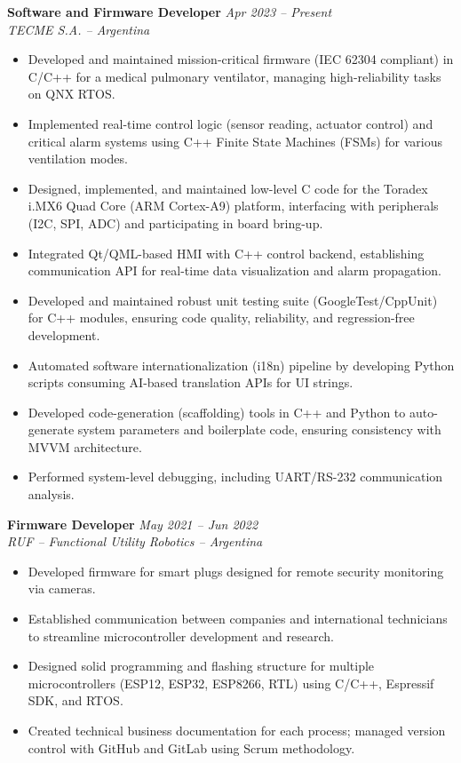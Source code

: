 \documentclass[11pt,a4paper]{article}
\newcommand{\resumeItem}[1]{\item #1}
\newcommand{\jobentry}[3]{%
    \noindent\textbf{#1} \hfill \textit{#2}\\
    \textit{#3}
}
\begin{document}
\jobentry{Software and Firmware Developer}{Apr 2023 -- Present}{TECME S.A. -- Argentina}
\begin{itemize}[leftmargin=*, nosep, topsep=4pt]
    \resumeItem{Developed and maintained mission-critical firmware (IEC 62304 compliant) in C/C++ for a medical pulmonary ventilator, managing high-reliability tasks on QNX RTOS.}
    \resumeItem{Implemented real-time control logic (sensor reading, actuator control) and critical alarm systems using C++ Finite State Machines (FSMs) for various ventilation modes.}
    \resumeItem{Designed, implemented, and maintained low-level C code for the Toradex i.MX6 Quad Core (ARM Cortex-A9) platform, interfacing with peripherals (I2C, SPI, ADC) and participating in board bring-up.}
    \resumeItem{Integrated Qt/QML-based HMI with C++ control backend, establishing communication API for real-time data visualization and alarm propagation.}
    \resumeItem{Developed and maintained robust unit testing suite (GoogleTest/CppUnit) for C++ modules, ensuring code quality, reliability, and regression-free development.}
    \resumeItem{Automated software internationalization (i18n) pipeline by developing Python scripts consuming AI-based translation APIs for UI strings.}
    \resumeItem{Developed code-generation (scaffolding) tools in C++ and Python to auto-generate system parameters and boilerplate code, ensuring consistency with MVVM architecture.}
    \resumeItem{Performed system-level debugging, including UART/RS-232 communication analysis.}
\end{itemize}

\vspace{6pt}

\jobentry{Firmware Developer}{May 2021 -- Jun 2022}{RUF -- Functional Utility Robotics -- Argentina}
\begin{itemize}[leftmargin=*, nosep, topsep=4pt]
    \resumeItem{Developed firmware for smart plugs designed for remote security monitoring via cameras.}
    \resumeItem{Established communication between companies and international technicians to streamline microcontroller development and research.}
    \resumeItem{Designed solid programming and flashing structure for multiple microcontrollers (ESP12, ESP32, ESP8266, RTL) using C/C++, Espressif SDK, and RTOS.}
    \resumeItem{Created technical business documentation for each process; managed version control with GitHub and GitLab using Scrum methodology.}
\end{itemize}

\vspace{6pt}
\end{document}
